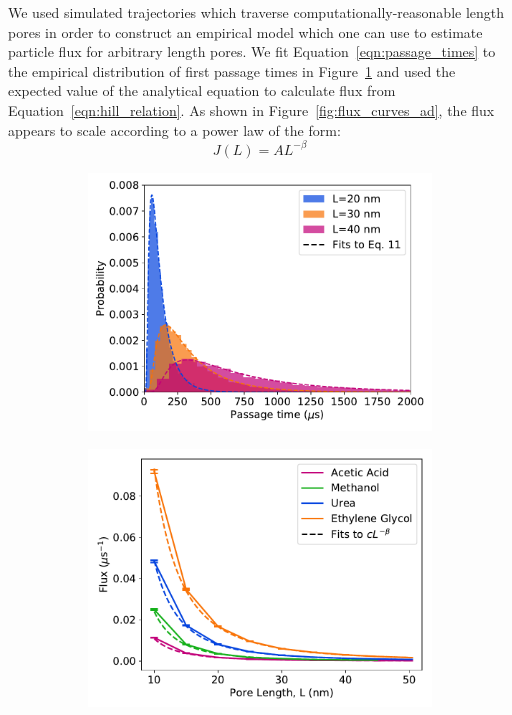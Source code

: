 \documentclass[journal=jctcce,manuscript=article]{achemso}
\begin{document}
  We used simulated trajectories which traverse computationally-reasonable
  length pores in order to construct an empirical model which one can use to
  estimate particle flux for arbitrary length pores. We fit
  Equation~\ref{eqn:passage_times} to the empirical distribution of first
  passage times in Figure~\ref{fig:fpt_distributions} and used the expected
  value of the analytical equation to calculate flux from
  Equation~\ref{eqn:hill_relation}. As shown in
  Figure~\ref{fig:flux_curves_ad}, the flux appears to scale according to a
  power law of the form:
  \begin{equation}
  J(L) = AL^{-\beta} 
  \label{eqn:flux_decay}
  \end{equation}

  \begin{figure}
  \centering
  \begin{subfigure}{0.485\textwidth}
  \includegraphics[width=\textwidth]{fpt_distributions.pdf}
  \caption{}\label{fig:fpt_distributions}
  \end{subfigure}
  \begin{subfigure}{0.485\textwidth}
  \includegraphics[width=\textwidth]{flux_curves.pdf}

\end{subfigure}
\end{figure}
\end{document}
